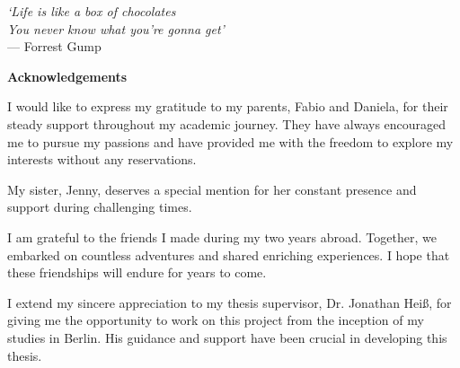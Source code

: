 \thispagestyle{empty}

\begin{flushright}
    \textsl{`Life is like a box of chocolates\\You never know what you're gonna get'}
    \\
    \medskip
    --- Forrest Gump
\end{flushright}


\bigskip

\begin{center}
    \textbf{Acknowledgements}
\end{center}

\noindent I would like to express my gratitude to my parents, Fabio and Daniela, for their steady support throughout my academic journey. They have always encouraged me to pursue my passions and have provided me with the freedom to explore my interests without any reservations.

\noindent My sister, Jenny, deserves a special mention for her constant presence and support during challenging times.

\noindent I am grateful to the friends I made during my two years abroad. Together, we embarked on countless adventures and shared enriching experiences. I hope that these friendships will endure for years to come.

\noindent I extend my sincere appreciation to my thesis supervisor, Dr. Jonathan Heiß, for giving me the opportunity to work on this project from the inception of my studies in Berlin. His guidance and support have been crucial in developing this thesis.
